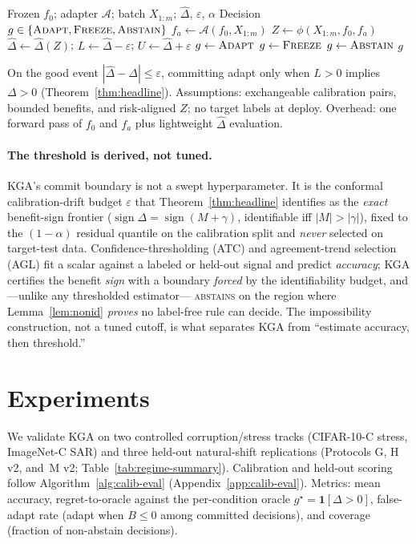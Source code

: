 \documentclass[conference]{IEEEtran}
\theoremstyle{plain}
\theoremstyle{definition}
\theoremstyle{remark}
\newcommand{\sign}{\operatorname{sign}}
\begin{document}
\begin{algorithm}[t]
\caption{\textsc{KGA}: Knowability-Guided Adaptation}
\label{alg:kga}
\begin{algorithmic}[1]
\Require Frozen $f_0$; adapter $\mathcal{A}$; batch $X_{1:m}$; $\widehat\Delta$, $\varepsilon$, $\alpha$
\Ensure Decision $g\in\{\textsc{Adapt},\textsc{Freeze},\textsc{Abstain}\}$
\State $f_a \leftarrow \mathcal{A}(f_0, X_{1:m})$
\State $Z \leftarrow \phi(X_{1:m}, f_0, f_a)$
\State $\widehat\Delta \leftarrow \widehat\Delta(Z)$;\;
  $L \leftarrow \widehat\Delta-\varepsilon$;\; $U \leftarrow \widehat\Delta+\varepsilon$
 \State $g\leftarrow\textsc{Adapt}$
 \State $g\leftarrow\textsc{Freeze}$
\Else \State $g\leftarrow\textsc{Abstain}$
\EndIf
\State \Return $g$
\end{algorithmic}
\end{algorithm}

On the good event $|\widehat\Delta-\Delta|\le\varepsilon$, committing adapt only when
$L>0$ implies $\Delta>0$ (Theorem~\ref{thm:headline}). Assumptions: exchangeable
calibration pairs, bounded benefits, and risk-aligned $Z$; no target labels at deploy.
Overhead: one forward pass of $f_0$ and $f_a$ plus lightweight $\widehat\Delta$ evaluation.

\paragraph{The threshold is derived, not tuned.}
\textsc{KGA}'s commit boundary is not a swept hyperparameter. It is the conformal
calibration-drift budget $\varepsilon$ that Theorem~\ref{thm:headline} identifies as the
\emph{exact} benefit-sign frontier ($\sign\Delta=\sign(M+\gamma)$, identifiable iff
$|M|>|\gamma|$), fixed to the $(1-\alpha)$ residual quantile on the calibration split and
\emph{never} selected on target-test data. Confidence-thresholding (ATC) and
agreement-trend selection (AGL) fit a scalar against a labeled or held-out signal and
predict \emph{accuracy}; \textsc{KGA} certifies the benefit \emph{sign} with a boundary
\emph{forced} by the identifiability budget, and---unlike any thresholded estimator---%
\textsc{abstains} on the region where Lemma~\ref{lem:nonid} \emph{proves} no label-free
rule can decide. The impossibility construction, not a tuned cutoff, is what separates
\textsc{KGA} from ``estimate accuracy, then threshold.''

\section{Experiments}\label{sec:exp}
We validate \textsc{KGA} on two controlled corruption/stress tracks (CIFAR-10-C stress,
ImageNet-C SAR) and three held-out natural-shift replications (Protocols G, H v2, and~M v2;
Table~\ref{tab:regime-summary}). Calibration and held-out scoring follow
Algorithm~\ref{alg:calib-eval} (Appendix~\ref{app:calib-eval}). Metrics: mean accuracy,
regret-to-oracle against the per-condition oracle $g^\star=\mathbf1[\Delta>0]$,
false-adapt rate (adapt when $B\le0$ among committed decisions), and coverage
(fraction of non-abstain decisions).
\end{document}
